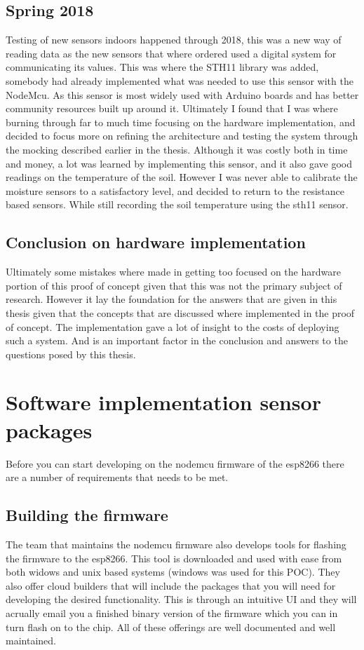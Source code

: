 \documentclass[]{uiophd}
\begin{document}
\subsection{Spring 2018}
Testing of new sensors indoors happened through 2018, this was a new way of reading data as the new sensors that where ordered used a digital system for communicating its values. This was where the STH11 library was added, somebody had already implemented what was needed to use this sensor with the NodeMcu. As this sensor is most widely used with Arduino boards and has better community resources built up around it. Ultimately I found that I was where burning through far to much time focusing on the hardware implementation, and decided to focus more on refining the architecture and testing the system through the mocking described earlier in the thesis. Although it was costly both in time and money, a lot was learned by implementing this sensor, and it also gave good readings on the temperature of the soil. However I was never able to calibrate the moisture sensors to a satisfactory level, and decided to return to the resistance based sensors. While still recording the soil temperature using the sth11 sensor. 
\subsection{Conclusion on hardware implementation}
Ultimately some mistakes where made in getting too focused on the hardware portion of this proof of concept given that this was not the primary subject of research. However it lay the foundation for the answers that are given in this thesis given that the concepts that are discussed where implemented in the proof of concept. The implementation gave a lot of insight to the costs of deploying such a system. And is an important factor in the conclusion and answers to the questions posed by this thesis.
\section{Software implementation sensor packages}
Before you can start developing on the nodemcu firmware of the esp8266 there are a number of requirements that needs to be met.
\subsection{Building the firmware}
The team that maintains the nodemcu firmware also develops tools for flashing the firmware to the esp8266. This tool is downloaded and used with ease from both widows and unix based systems (windows was used for this POC). They also offer cloud builders that will include the packages that you will need for developing the desired functionality. This is through an intuitive UI and they will acrually email you a finished binary version of the firmware which you can in turn flash on to the chip. All of these offerings are well documented and well maintained.
\end{document}

